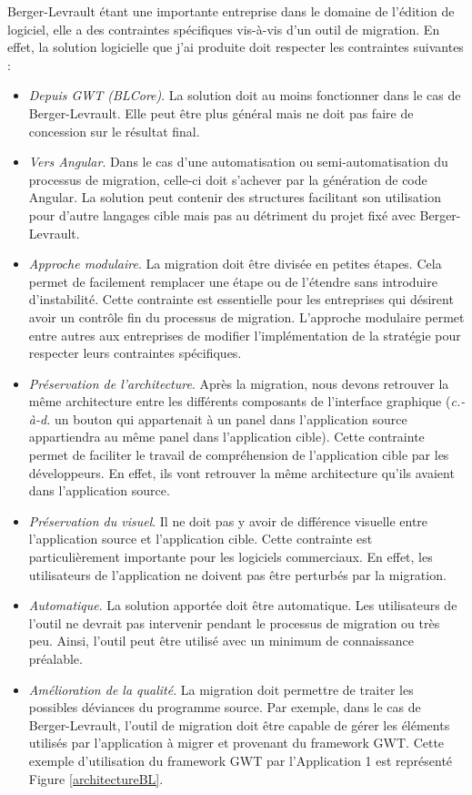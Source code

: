 \documentclass[11pt,]{article}
\providecommand{\tightlist}{%
  \setlength{\itemsep}{0pt}\setlength{\parskip}{0pt}}
\begin{document}
Berger-Levrault étant une importante entreprise dans le domaine de
l'édition de logiciel, elle a des contraintes spécifiques vis-à-vis d'un
outil de migration. En effet, la solution logicielle que j'ai produite
doit respecter les contraintes suivantes :

\begin{itemize}
\tightlist
\item
  \emph{Depuis GWT (BLCore)}. La solution doit au moins fonctionner dans
  le cas de Berger-Levrault. Elle peut être plus général mais ne doit
  pas faire de concession sur le résultat final.
\item
  \emph{Vers Angular}. Dans le cas d'une automatisation ou
  semi-automatisation du processus de migration, celle-ci doit s'achever
  par la génération de code Angular. La solution peut contenir des
  structures facilitant son utilisation pour d'autre langages cible mais
  pas au détriment du projet fixé avec Berger-Levrault.
\item
  \emph{Approche modulaire}. La migration doit être divisée en petites
  étapes. Cela permet de facilement remplacer une étape ou de l'étendre
  sans introduire d'instabilité. Cette contrainte est essentielle pour
  les entreprises qui désirent avoir un contrôle fin du processus de
  migration. L'approche modulaire permet entre autres aux entreprises de
  modifier l'implémentation de la stratégie pour respecter leurs
  contraintes spécifiques.
\item
  \emph{Préservation de l'architecture}. Après la migration, nous devons
  retrouver la même architecture entre les différents composants de
  l'interface graphique (\emph{c.-à-d.} un bouton qui appartenait à un
  panel dans l'application source appartiendra au même panel dans
  l'application cible). Cette contrainte permet de faciliter le travail
  de compréhension de l'application cible par les développeurs. En
  effet, ils vont retrouver la même architecture qu'ils avaient dans
  l'application source.
\item
  \emph{Préservation du visuel}. Il ne doit pas y avoir de différence
  visuelle entre l'application source et l'application cible. Cette
  contrainte est particulièrement importante pour les logiciels
  commerciaux. En effet, les utilisateurs de l'application ne doivent
  pas être perturbés par la migration.
\item
  \emph{Automatique}. La solution apportée doit être automatique. Les
  utilisateurs de l'outil ne devrait pas intervenir pendant le processus
  de migration ou très peu. Ainsi, l'outil peut être utilisé avec un
  minimum de connaissance préalable.
\item
  \emph{Amélioration de la qualité}. La migration doit permettre de
  traiter les possibles déviances du programme source. Par exemple, dans
  le cas de Berger-Levrault, l'outil de migration doit être capable de
  gérer les éléments utilisés par l'application à migrer et provenant du
  framework GWT. Cette exemple d'utilisation du framework GWT par
  l'Application 1 est représenté Figure \ref{architectureBL}.
\end{itemize}
\end{document}

